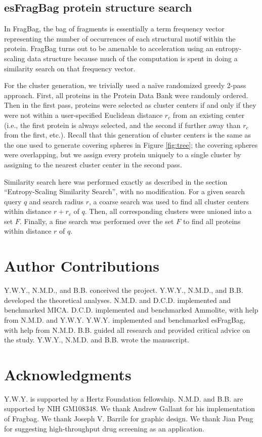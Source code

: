 \documentclass[11pt]{elsarticle}
\theoremstyle{definition}
\theoremstyle{remark}
\numberwithin{equation}{section}
\begin{document}
\subsection{esFragBag protein structure search}
In FragBag, the bag of fragments is essentially
a term frequency vector representing the number of occurrences of each structural motif within the protein.
FragBag turns out to be amenable to acceleration using an entropy-scaling data structure because much of the computation is spent in doing a similarity search on that frequency vector.

For the cluster generation, we trivially used a na\"ive randomized greedy 2-pass approach.
First, all proteins in the Protein Data Bank were randomly ordered.
Then in the first pass, proteins were selected as cluster centers if and only if they were not within a user-specified Euclidean distance $r_c$ from an existing center (i.e., the first protein is always selected, and the second if further away than $r_c$ from the first, etc.).
Recall that this generation of cluster centers is the same as the one used to generate covering spheres in Figure \ref{fig:tree};
the covering spheres were overlapping, but we assign every protein uniquely to a single cluster by assigning to the nearest cluster center in the second pass.

Similarity search here was performed exactly as described in the section ``Entropy-Scaling Similarity Search'', with no modification.
For a given search query $q$ and search radius $r$,
a coarse search was used to find all cluster centers within distance $r+r_c$ of $q$.
Then, all corresponding clusters were unioned into a set $F$.
Finally, a fine search was performed over the set $F$ to find all proteins within distance $r$ of $q$.

\section{Author Contributions}
Y.W.Y., N.M.D., and B.B. conceived the project.
Y.W.Y., N.M.D., and B.B. developed the theoretical analyses.
N.M.D. and D.C.D. implemented and benchmarked MICA.
D.C.D. implemented and benchmarked Ammolite, with help from N.M.D. and Y.W.Y.
Y.W.Y. implemented and benchmarked esFragBag, with help from N.M.D.
B.B. guided all research and provided critical advice on the study.
Y.W.Y., N.M.D. and B.B. wrote the manuscript.

\section{Acknowledgments}
Y.W.Y. is supported by a Hertz Foundation fellowship.
N.M.D. and B.B. are supported by NIH GM108348.
We thank Andrew Gallant for his implementation of Fragbag.
We thank Joseph V. Barrile for graphic design.
We thank Jian Peng for suggesting high-throughput drug screening as an application.


%

\end{document}
